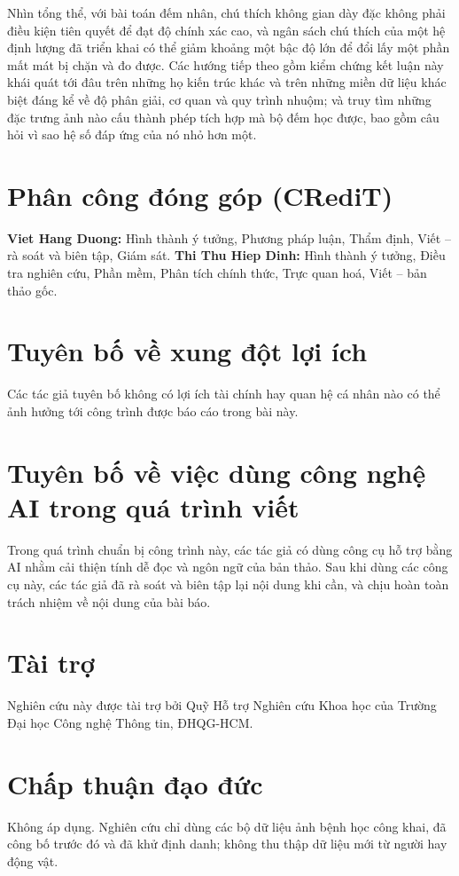 \documentclass[preprint,12pt]{elsarticle}
\begin{document}
Nhìn tổng thể, với bài toán đếm nhân, chú thích không gian dày đặc không phải điều kiện tiên quyết để đạt độ chính
xác cao, và ngân sách chú thích của một hệ định lượng đã triển khai có thể giảm khoảng một bậc độ lớn để đổi lấy
một phần mất mát bị chặn và đo được. Các hướng tiếp theo gồm kiểm chứng kết luận này khái quát tới đâu trên những
họ kiến trúc khác và trên những miền dữ liệu khác biệt đáng kể về độ phân giải, cơ quan và quy trình nhuộm; và
truy tìm những đặc trưng ảnh nào cấu thành phép tích hợp mà bộ đếm học được, bao gồm câu hỏi vì sao hệ số đáp ứng
của nó nhỏ hơn một.

\section*{Phân công đóng góp (CRediT)}
\textbf{Viet Hang Duong:} Hình thành ý tưởng, Phương pháp luận, Thẩm định, Viết -- rà soát và biên tập, Giám sát.
\textbf{Thi Thu Hiep Dinh:} Hình thành ý tưởng, Điều tra nghiên cứu, Phần mềm, Phân tích chính thức, Trực quan
hoá, Viết -- bản thảo gốc.

\section*{Tuyên bố về xung đột lợi ích}
Các tác giả tuyên bố không có lợi ích tài chính hay quan hệ cá nhân nào có thể ảnh hưởng tới công trình được báo
cáo trong bài này.

\section*{Tuyên bố về việc dùng công nghệ AI trong quá trình viết}
Trong quá trình chuẩn bị công trình này, các tác giả có dùng công cụ hỗ trợ bằng AI nhằm cải thiện tính dễ đọc và
ngôn ngữ của bản thảo. Sau khi dùng các công cụ này, các tác giả đã rà soát và biên tập lại nội dung khi cần, và
chịu hoàn toàn trách nhiệm về nội dung của bài báo.

\section*{Tài trợ}
Nghiên cứu này được tài trợ bởi Quỹ Hỗ trợ Nghiên cứu Khoa học của Trường Đại học Công nghệ Thông tin, ĐHQG-HCM.

\section*{Chấp thuận đạo đức}
Không áp dụng. Nghiên cứu chỉ dùng các bộ dữ liệu ảnh bệnh học công khai, đã công bố trước đó và đã khử định danh;
không thu thập dữ liệu mới từ người hay động vật.
\end{document}
